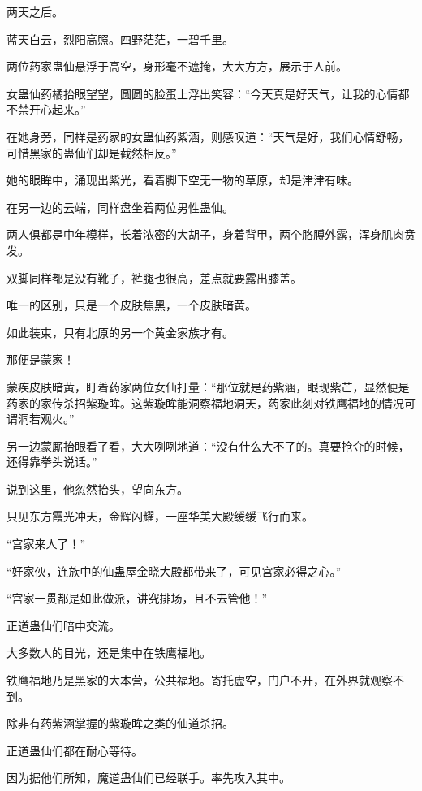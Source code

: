 
\begin{this_body}

两天之后。

蓝天白云，烈阳高照。四野茫茫，一碧千里。

两位药家蛊仙悬浮于高空，身形毫不遮掩，大大方方，展示于人前。

女蛊仙药橘抬眼望望，圆圆的脸蛋上浮出笑容：“今天真是好天气，让我的心情都不禁开心起来。”

在她身旁，同样是药家的女蛊仙药紫涵，则感叹道：“天气是好，我们心情舒畅，可惜黑家的蛊仙们却是截然相反。”

她的眼眸中，涌现出紫光，看着脚下空无一物的草原，却是津津有味。

在另一边的云端，同样盘坐着两位男性蛊仙。

两人俱都是中年模样，长着浓密的大胡子，身着背甲，两个胳膊外露，浑身肌肉贲发。

双脚同样都是没有靴子，裤腿也很高，差点就要露出膝盖。

唯一的区别，只是一个皮肤焦黑，一个皮肤暗黄。

如此装束，只有北原的另一个黄金家族才有。

那便是蒙家！

蒙疾皮肤暗黄，盯着药家两位女仙打量：“那位就是药紫涵，眼现紫芒，显然便是药家的家传杀招紫璇眸。这紫璇眸能洞察福地洞天，药家此刻对铁鹰福地的情况可谓洞若观火。”

另一边蒙厮抬眼看了看，大大咧咧地道：“没有什么大不了的。真要抢夺的时候，还得靠拳头说话。”

说到这里，他忽然抬头，望向东方。

只见东方霞光冲天，金辉闪耀，一座华美大殿缓缓飞行而来。

“宫家来人了！”

“好家伙，连族中的仙蛊屋金晓大殿都带来了，可见宫家必得之心。”

“宫家一贯都是如此做派，讲究排场，且不去管他！”

正道蛊仙们暗中交流。

大多数人的目光，还是集中在铁鹰福地。

铁鹰福地乃是黑家的大本营，公共福地。寄托虚空，门户不开，在外界就观察不到。

除非有药紫涵掌握的紫璇眸之类的仙道杀招。

正道蛊仙们都在耐心等待。

因为据他们所知，魔道蛊仙们已经联手。率先攻入其中。


\end{this_body}
